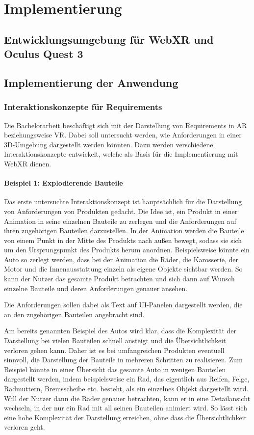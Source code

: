 \chapter{Implementierung}

\section{Entwicklungsumgebung für WebXR und Oculus Quest 3}

\section{Implementierung der Anwendung}

\subsection{Interaktionskonzepte für Requirements}

Die Bachelorarbeit beschäftigt sich mit der Darstellung von Requirements in AR beziehungsweise VR.
Dabei soll untersucht werden, wie Anforderungen in einer 3D-Umgebung dargestellt werden könnten.
Dazu werden verschiedene Interaktionskonzepte entwickelt, welche als Basis für die Implementierung mit WebXR dienen.


\subsubsection{Beispiel 1: Explodierende Bauteile}

Das erste untersuchte Interaktionskonzept ist hauptsächlich für die Darstellung von Anforderungen von Produkten gedacht.
Die Idee ist, ein Produkt in einer Animation in seine einzelnen Bauteile zu zerlegen und die Anforderungen auf ihren zugehörigen Bauteilen darzustellen.
In der Animation werden die Bauteile von einem Punkt in der Mitte des Produkts nach außen bewegt, sodass sie sich um den Ursprungspunkt des Produkts herum anordnen.
Beispielsweise könnte ein Auto so zerlegt werden, dass bei der Animation die Räder, die Karosserie, der Motor und die Innenausstattung einzeln als eigene Objekte sichtbar werden.
So kann der Nutzer das gesamte Produkt betrachten und sich dann auf Wunsch einzelne Bauteile und deren Anforderungen genauer ansehen.

Die Anforderungen sollen dabei als Text auf UI-Panelen dargestellt werden, die an den zugehörigen Bauteilen angebracht sind.

Am bereits genannten Beispiel des Autos wird klar, dass die Komplexität der Darstellung bei vielen Bauteilen schnell ansteigt und die Übersichtlichkeit verloren gehen kann.
Daher ist es bei umfangreichen Produkten eventuell sinnvoll, die Darstellung der Bauteile in mehreren Schritten zu realisieren.
Zum Beispiel könnte in einer Übersicht das gesamte Auto in wenigen Bauteilen dargestellt werden, indem beispielsweise ein Rad, das eigentlich aus Reifen, Felge, Radmuttern, Bremsscheibe etc. besteht, als ein einzelnes Objekt dargestellt wird.
Will der Nutzer dann die Räder genauer betrachten, kann er in eine Detailansicht wechseln, in der nur ein Rad mit all seinen Bauteilen animiert wird.
So lässt sich eine hohe Komplexität der Darstellung erreichen, ohne dass die Übersichtlichkeit verloren geht.


